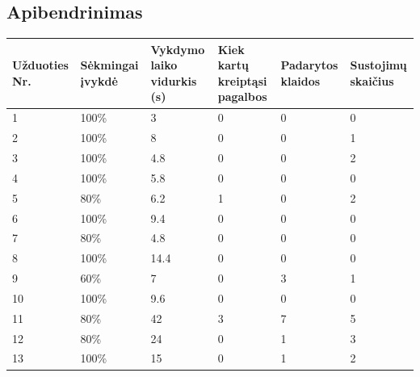 \documentclass[oneside]{VUMIFPSkursinis}
\begin{document}
\subsection{Apibendrinimas}
\begin{center}
	\begin{tabular}{ |p{1.6cm}| p{2cm} |p{3cm}|p{3cm}|p{3cm}| p{2.4cm} |}
\hline
Užduoties Nr.&Sėkmingai įvykdė&Vykdymo laiko vidurkis (s)&Kiek kartų kreiptąsi pagalbos&Padarytos klaidos&Sustojimų skaičius\\ \hline
1  &  100\% & 3 & 0 & 0 & 0\\ \hline
2  &  100\% & 8 & 0 & 0 & 1 \\ \hline
3  &  100\% & 4.8 & 0 & 0 & 2 \\ \hline
4  &  100\% &  5.8 & 0 & 0 & 0\\ \hline
5  &  80\% &  6.2 & 1 & 0 & 2 \\ \hline
6  &  100\% &  9.4 & 0 & 0 & 0 \\ \hline
7  &  80\% & 4.8 & 0 & 0 & 0 \\ \hline
8  &  100\% & 14.4 & 0 & 0 & 0 \\ \hline
9  &  60\% & 7 & 0 & 3 & 1\\ \hline
10 &  100\% & 9.6 & 0 & 0 & 0 \\ \hline
11 &  80\% &  42 & 3 & 7 & 5\\ \hline
12 &  80\% & 24 & 0 & 1 & 3\\ \hline
13 &  100\% & 15 & 0 & 1 & 2\\ \hline
\end{tabular}
\end{center}
\newpage
\end{document}
